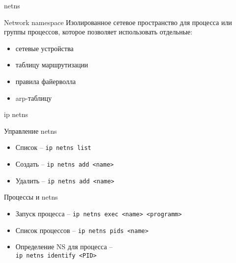 \begin{frame}[fragile]{netns}
    \begin{block}{Network namespace}
		Изолированное сетевое пространство для процесса или группы процессов,
        которое позволяет использовать отдельные:

        \begin{itemize}
            \item сетевые устройства
            \item таблицу маршрутизации
            \item правила файерволла
            \item arp-таблицу
        \end{itemize}
    \end{block}
\end{frame}

\begin{frame}[fragile]{ip netns}
    \begin{block}{Управление netns}
        \begin{itemize}
            \item Список -- {\tt ip netns list}
            \item Создать -- {\tt ip netns add <name>}
            \item Удалить -- {\tt ip netns add <name>}
        \end{itemize}
    \end{block}

    \begin{block}{Процессы и netns}
        \begin{itemize}
            \item Запуск процесса -- {\tt ip netns exec <name> <programm>}
            \item Список процессов -- {\tt ip netns pids <name> }
            \item Определение NS для процесса -- \\
                {\tt ip netns identify <PID>}
        \end{itemize}
    \end{block}
\end{frame}

